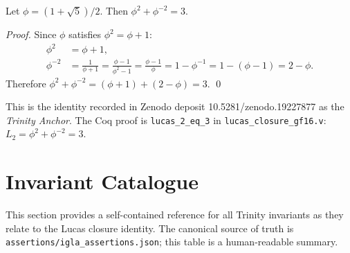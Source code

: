 \begin{theorem}[$\phi^2 + \phi^{-2} = 3$]
\label{thm:29-phi-identity}
Let $\phi = (1 + \sqrt{5})/2$.  Then $\phi^2 + \phi^{-2} = 3$.
\end{theorem}
\begin{proof}
Since $\phi$ satisfies $\phi^2 = \phi + 1$:
\begin{align}
  \phi^2 &= \phi + 1, \\
  \phi^{-2} &= \frac{1}{\phi + 1} = \frac{\phi - 1}{\phi^2 - 1}
              = \frac{\phi - 1}{\phi} = 1 - \phi^{-1} = 1 - (\phi - 1)
              = 2 - \phi.
\end{align}
Therefore $\phi^2 + \phi^{-2} = (\phi + 1) + (2 - \phi) = 3$.
\qed
\end{proof}

\noindent
This is the identity recorded in Zenodo deposit 10.5281/zenodo.19227877
as the \emph{Trinity Anchor}.  The Coq proof is
\texttt{lucas\_2\_eq\_3} in \texttt{lucas\_closure\_gf16.v}:
$L_2 = \phi^2 + \phi^{-2} = 3$.

\section{Invariant Catalogue}
\label{sec:29-inv-catalogue}

This section provides a self-contained reference for all Trinity
invariants as they relate to the Lucas closure identity.  The
canonical source of truth is \texttt{assertions/igla\_assertions.json};
this table is a human-readable summary.


